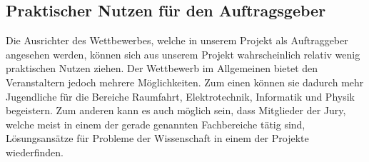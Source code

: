 \subsection{Praktischer Nutzen für den Auftragsgeber}
Die Ausrichter des Wettbewerbes, welche in unserem Projekt als Auftraggeber angesehen werden, können sich aus unserem Projekt wahrscheinlich relativ wenig praktischen Nutzen ziehen. Der Wettbewerb im Allgemeinen bietet den Veranstaltern jedoch mehrere Möglichkeiten. Zum einen können sie dadurch mehr Jugendliche für die Bereiche Raumfahrt, Elektrotechnik, Informatik und Physik begeistern. Zum anderen kann es auch möglich sein, dass Mitglieder der Jury, welche meist in einem der gerade genannten Fachbereiche tätig sind, Lösungsansätze für Probleme der Wissenschaft in einem der Projekte wiederfinden.


